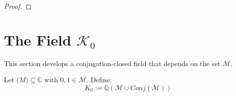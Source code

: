 \begin{proof}
%    
    \end{proof}

\section[K zero]{The Field $\mathcal{K}_0$}
This section develops a conjugation-closed field that depends on the set $\mathcal{M}$.
\begin{definition}
    \label{def:K_M_0}
    \leanok
    Let $\mathcal(M)\subseteq\mathbb{C}$ with $0,1 \in \mathcal{M}$. Define:
    \begin{equation*}
        K_0 := \mathbb{Q}(\mathcal{M}\cup Conj(\mathcal{M}))
    \end{equation*}
\end{definition}

